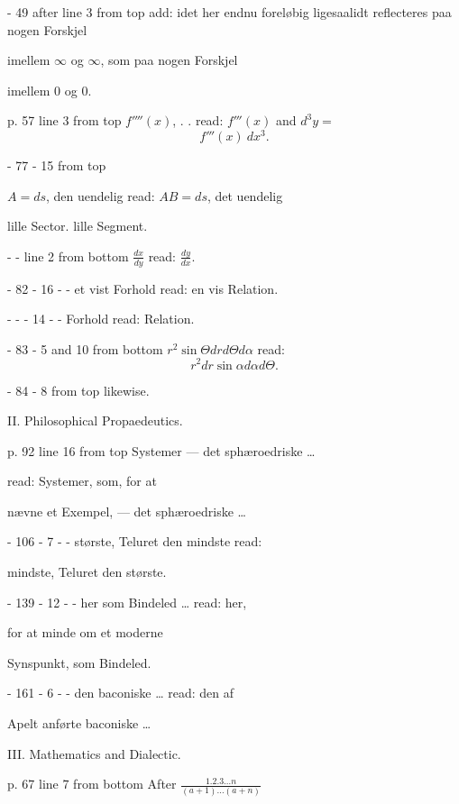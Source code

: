 \documentclass[12pt,a4paper,openany]{book}
\newcommand{\opage}[1]{\marginnote{\footnotesize\textit{[#1]}}}
\begin{document}
\noindent - 49 after line 3 from top add: idet her endnu foreløbig ligesaalidt reflecteres paa nogen Forskjel

\noindent imellem $\infty$ og $\infty$, som paa nogen Forskjel

\noindent imellem $0$ og $0$.

\opage{54}\setcounter{footnote}{0}%
p. 57 line 3 from top $f''''(x)$, . . read: $f'''(x)$ and $d^{3}y =$
\[ f'''(x)\ dx^{3}. \]

\noindent - 77 - 15 from top

\noindent $A = ds$, den uendelig read: $AB = ds$, det uendelig

\noindent lille Sector. lille Segment.

\noindent - - line 2 from bottom $\frac{dx}{dy}$ read: $\frac{dy}{dx}$.

\noindent - 82 - 16 - - et vist Forhold read: en vis Relation.

\noindent - - - 14 - - Forhold read: Relation.

\noindent - 83 - 5 and 10 from bottom $r^{2} \sin \Theta dr d\Theta d\alpha$ read:
\[ r^{2} dr \sin \alpha d\alpha d\Theta. \]

\noindent - 84 - 8 from top likewise.

\begin{center}II. Philosophical Propaedeutics.\end{center}

\noindent p. 92 line 16 from top Systemer --- det sphæroedriske \dots{}

\noindent read: Systemer, som, for at

\noindent nævne et Exempel, --- det sphæroedriske \dots{}

\noindent - 106 - 7 - - største, Teluret den mindste read:

\noindent mindste, Teluret den største.

\noindent - 139 - 12 - - her som Bindeled \dots{} read: her,

\noindent for at minde om et moderne

\noindent Synspunkt, som Bindeled.

\noindent - 161 - 6 - - den baconiske \dots{} read: den af

\noindent Apelt anførte baconiske \dots{}

\begin{center}III. Mathematics and Dialectic.\end{center}

\noindent p. 67 line 7 from bottom After $\frac{1.2.3 \dots n}{(a+1) \dots (a+n)}$
\end{document}
